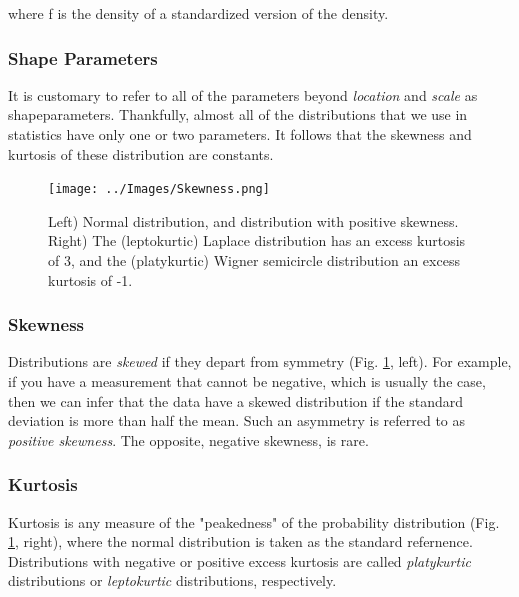 where f is the density of a standardized version of the density.

\subsubsection{Shape Parameters}

It is customary to refer to all of the parameters beyond \emph{location} and \emph{scale} as \glspl{shapeparameter}. Thankfully, almost all of the distributions that we use in statistics have only one or two parameters. It follows that the \gls{skewness} and \gls{kurtosis} of these distribution are constants.

\begin{figure}
  \centering
  \texttt{[image: ../Images/Skewness.png]}\\
  \caption{Left) Normal distribution, and distribution with positive skewness. Right) The (leptokurtic) Laplace distribution has an excess kurtosis of 3, and the (platykurtic) Wigner semicircle distribution an excess kurtosis of -1.}\label{fig:skewkurtosis}
\end{figure}

\subsubsection{Skewness}

Distributions are \emph{skewed} if they depart from symmetry (Fig. \ref{fig:skewkurtosis}, left). For example, if you have a measurement that cannot be negative, which is usually the case, then we can infer that the data have a skewed distribution if the standard deviation is more than half the mean. Such an asymmetry is referred to as \emph{positive skewness}. The opposite, negative skewness, is rare.

\subsubsection{Kurtosis}

Kurtosis is any measure of the "peakedness" of the probability distribution (Fig. \ref{fig:skewkurtosis}, right), where the normal distribution is taken as the standard refernence. Distributions with negative or positive excess kurtosis are called \emph{platykurtic} distributions or \emph{leptokurtic} distributions, respectively.


